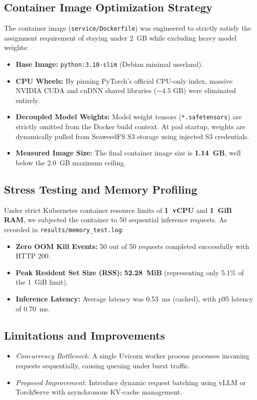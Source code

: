 \documentclass[10pt,a4paper]{article}
\begin{document}
\subsection{Container Image Optimization Strategy}
The container image (\texttt{service/Dockerfile}) was engineered to strictly satisfy the assignment requirement of staying under 2~GB while excluding heavy model weights:
\begin{itemize}[noitemsep,topsep=2pt,leftmargin=*]
    \item \textbf{Base Image:} \texttt{python:3.10-slim} (Debian minimal userland).
    \item \textbf{CPU Wheels:} By pinning PyTorch's official CPU-only index, massive NVIDIA CUDA and cuDNN shared libraries ($\sim 4.5\text{ GB}$) were eliminated entirely.
    \item \textbf{Decoupled Model Weights:} Model weight tensors (\texttt{*.safetensors}) are strictly omitted from the Docker build context. At pod startup, weights are dynamically pulled from SeaweedFS S3 storage using injected S3 credentials.
    \item \textbf{Measured Image Size:} The final container image size is \textbf{1.14~GB}, well below the 2.0~GB maximum ceiling.
\end{itemize}

\subsection{Stress Testing and Memory Profiling}
Under strict Kubernetes container resource limits of \textbf{1~vCPU} and \textbf{1~GiB RAM}, we subjected the container to 50 sequential inference requests. As recorded in \texttt{results/memory\_test.log}:
\begin{itemize}[noitemsep,topsep=2pt,leftmargin=*]
    \item \textbf{Zero OOM Kill Events:} 50 out of 50 requests completed successfully with HTTP 200.
    \item \textbf{Peak Resident Set Size (RSS):} \textbf{52.28~MiB} (representing only 5.1\% of the 1~GiB limit).
    \item \textbf{Inference Latency:} Average latency was 0.53~ms (cached), with p95 latency of 0.70~ms.
\end{itemize}

\subsection{Limitations and Improvements}
\begin{itemize}[noitemsep,topsep=2pt,leftmargin=*]
    \item \textit{Concurrency Bottleneck:} A single Uvicorn worker process processes incoming requests sequentially, causing queuing under burst traffic.
    \item \textit{Proposed Improvement:} Introduce dynamic request batching using vLLM or TorchServe with asynchronous KV-cache management.
\end{itemize}
\end{document}
